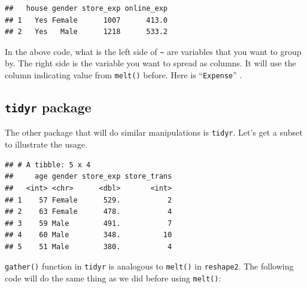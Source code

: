 \documentclass[12pt,]{krantz}
\makeatletter
\newenvironment{Shaded}{\begin{snugshade}}{\end{snugshade}}
\newcommand{\CommentTok}[1]{\textcolor[rgb]{0.37,0.37,0.37}{\textit{#1}}}
\newcommand{\DecValTok}[1]{\textcolor[rgb]{0.06,0.06,0.06}{#1}}
\newcommand{\KeywordTok}[1]{\textcolor[rgb]{0.27,0.27,0.27}{\textbf{#1}}}
\newcommand{\NormalTok}[1]{#1}
\newcommand{\OperatorTok}[1]{\textcolor[rgb]{0.43,0.43,0.43}{\textbf{#1}}}
\newcommand{\StringTok}[1]{\textcolor[rgb]{0.5,0.5,0.5}{#1}}
\newenvironment{kframe}{%
\medskip{}
\setlength{\fboxsep}{.8em}
 \def\at@end@of@kframe{}%
 \ifinner\ifhmode%
  \def\at@end@of@kframe{\end{minipage}}%
  \begin{minipage}{\columnwidth}%
 \fi\fi%
 \def\FrameCommand##1{\hskip\@totalleftmargin \hskip-\fboxsep
 \colorbox{shadecolor}{##1}\hskip-\fboxsep
     \hskip-\linewidth \hskip-\@totalleftmargin \hskip\columnwidth}%
 \MakeFramed {\advance\hsize-\width
   \@totalleftmargin\z@ \linewidth\hsize
   \@setminipage}}%
 {\par\unskip\endMakeFramed%
 \at@end@of@kframe}
\renewenvironment{Shaded}{\begin{kframe}}{\end{kframe}}
\makeatother
\begin{document}
\begin{verbatim}
##   house gender store_exp online_exp
## 1   Yes Female      1007      413.0
## 2   Yes   Male      1218      533.2
\end{verbatim}

In the above code, what is the left side of \texttt{\textasciitilde{}} are variables that you want to group by. The right side is the variable you want to spread as columns. It will use the column indicating value from \texttt{melt()} before. Here is ``\texttt{Expense}'' .

\hypertarget{tidyr-package}{%
\subsection{\texorpdfstring{\texttt{tidyr} package}{tidyr package}}\label{tidyr-package}}

The other package that will do similar manipulations is \texttt{tidyr}. Let's get a subset to illustrate the usage.

\begin{Shaded}
\end{Shaded}

\begin{verbatim}
## # A tibble: 5 x 4
##     age gender store_exp store_trans
##   <int> <chr>      <dbl>       <int>
## 1    57 Female      529.           2
## 2    63 Female      478.           4
## 3    59 Male        491.           7
## 4    60 Male        348.          10
## 5    51 Male        380.           4
\end{verbatim}

\texttt{gather()} function in \texttt{tidyr} is analogous to \texttt{melt()} in \texttt{reshape2}. The following code will do the same thing as we did before using \texttt{melt()}:

\begin{Shaded}
\end{Shaded}
\end{document}

